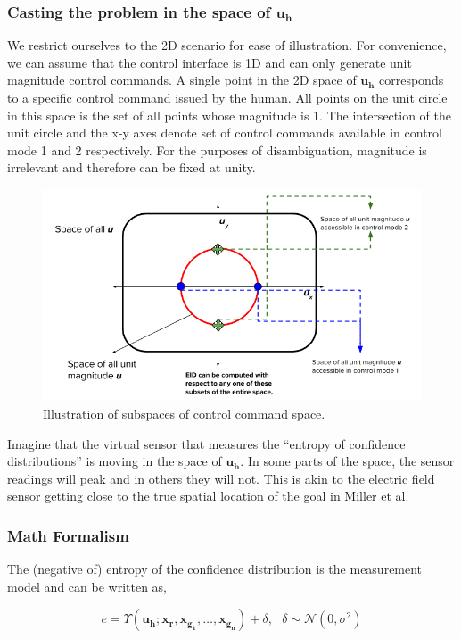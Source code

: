 \documentclass[]{article}
\begin{document}
\subsubsection*{Casting the problem in the space of $\boldsymbol{u_h}$}

We restrict ourselves to the 2D scenario for ease of illustration. For convenience, we can assume that the control interface is 1D and can only generate unit magnitude control commands. A single point in the 2D space of $\boldsymbol{u_h}$ corresponds to a specific control command issued by the human. All points on the unit circle in this space is the set of all points whose magnitude is 1. The intersection of the unit circle and the x-y axes denote set of control commands available in control mode 1 and 2 respectively. For the purposes of disambiguation, magnitude is irrelevant and therefore can be fixed at unity. 
\begin{figure}[h]
		\centering
	\includegraphics[width = 0.7\hsize, height = 0.26\vsize]{./figures/UH_SPACE.png}
	\vspace{-0.4cm}
	\caption{Illustration of subspaces of control command space.}
	\label{DM_FIG}
\end{figure}

Imagine that the virtual sensor that measures the ``entropy of confidence distributions'' is moving in the space of $\boldsymbol{u_h}$. 
In some parts of the space, the sensor readings will peak and in others they will not. This is akin to the electric field sensor getting close to the true spatial location of the goal in Miller et al. 

\subsubsection*{Math Formalism}

The (negative of) entropy of the confidence distribution is the measurement model and can be written as, 

\begin{equation*}
e = \Upsilon(\boldsymbol{u_h}; \boldsymbol{x_r}, \boldsymbol{x_{g_1}},\dots,\boldsymbol{x_{g_n}}) + \delta, ~~~ \delta \sim \mathcal{N}(0, \sigma^2)
\end{equation*}
\end{document}
